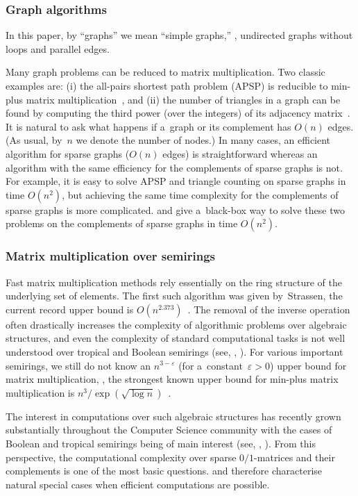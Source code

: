 \documentclass{toc}
\begin{document}
\subsubsection{Graph algorithms}
%
%
%
%
In this paper, by ``graphs'' we mean ``simple graphs,'' \ie,
undirected graphs without loops and parallel edges.

Many graph problems can be reduced to matrix multiplication.
Two classic examples are: (i) the all-pairs shortest path problem (APSP) is
reducible to min-plus matrix multiplication~\cite{DBLP:conf/focs/FischerM71},
and (ii) the number of triangles in %
a %
graph can be found by
computing the third power (over the integers) of its adjacency
matrix~\cite{Itai_Rodeh_siam,Williams2009TriangleDV}.
It is natural to ask what happens if a~graph
or its complement %
%
has $O(n)$ edges.  %
%
(As usual, by~$n$ we denote the number of nodes.)
In many cases, an efficient algorithm
for sparse graphs ($O(n)$ edges) is straightforward
whereas an algorithm with the same efficiency for
the %
complements of sparse graphs
%
%
%
%
is not. For
example, it is easy to solve APSP and triangle counting on sparse graphs in
time $O(n^2)$, but achieving the same time complexity for
the %
complements of sparse
graphs is more complicated.
 and  give
a~black-box way to solve these two problems on
the %
complements of sparse graphs in
time $O(n^2)$.

\subsubsection{Matrix multiplication over semirings}  Fast matrix
multiplication methods rely essentially on the ring structure of the underlying
set of elements. The first such algorithm was given by~Strassen,
the current record upper bound is
$O(n^{2.373})$~\cite{DBLP:conf/stoc/Williams12, DBLP:conf/issac/Gall14a}.
The removal of the inverse operation often drastically increases the complexity
of algorithmic problems over algebraic structures, and even the complexity of
standard computational tasks %
is  %
not well understood over tropical and
Boolean semirings (see, \eg, \cite{Williams14,GrigorievP15}).
For various important semirings,
we still do not know an $n^{3-\varepsilon}$ (for a~constant~$\varepsilon>0$)
upper bound for matrix multiplication, \eg, the strongest known upper bound for
min-plus matrix multiplication is $n^3/\exp(\sqrt{\log n})$~\cite{Williams14}.

The interest in computations over such algebraic structures has
recently %
grown  %
substantially throughout the Computer Science community
%
%
%
with the cases of Boolean and
tropical semirings being of main interest (see,
\eg, \cite{Jukna16,Williams14,butkovic10systems}).
From this perspective, the %
computational %
complexity over %
sparse $0/1$-matrices and their complements %
is one of the most basic questions.
 and 
therefore characterise natural special
cases when efficient computations are possible.
\end{document}
